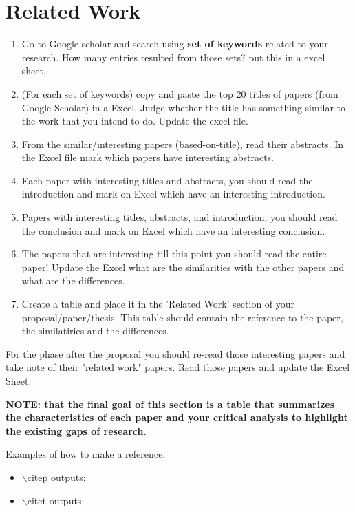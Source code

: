 \section{Related Work}

\begin{enumerate}
\item Go to Google scholar and search using \textbf{set of keywords} related to your research. How many entries resulted from those sets? put this in a excel sheet.
\item (For each set of keywords) copy and paste the top 20 titles of papers (from Google Scholar) in a Excel. Judge whether the title has something similar to the work that you intend to do. Update the excel file.
\item From the similar/interesting papers (based-on-title), read their abstracts. In the Excel file mark which papers have interesting abstracts. 
\item Each paper with interesting titles and abstracts, you should read the introduction and mark on Excel which have an interesting introduction.
\item Papers with interesting titles, abstracts, and introduction, you should read the conclusion and mark on Excel which have an interesting conclusion.
\item The papers that are interesting till this point you should read the entire paper! Update the Excel what are the similarities with the other papers and what are the differences.
\item Create a table and place it in the 'Related Work' section of your proposal/paper/thesis. This table should contain the reference to the paper, the similatiries and the differences. 
\end{enumerate}

For the phase after the proposal you should re-read those interesting papers and take note of their "related work" papers. Read those papers and update the Excel Sheet.

\textbf{NOTE: that the final goal of this section is a table that summarizes the characteristics of each paper and your critical analysis to highlight the existing gaps of research.}

Examples of how to make a reference:
\begin{itemize}
	\item $\backslash$citep outputs: \citep{jjsantanna2015IM1}
	\item $\backslash$citet outputs: \citet{jjsantanna2015IM1}
\end{itemize}
